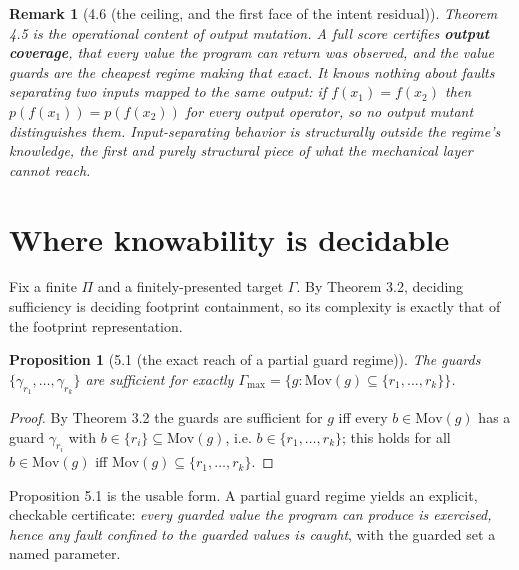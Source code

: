 \documentclass[conference]{IEEEtran}
\newcommand{\Mov}{\mathrm{Mov}}
\theoremstyle{run}
\newtheorem*{proposition}{Proposition}
\newtheorem*{remark}{Remark}
\begin{document}
\begin{remark}[4.6 (the ceiling, and the first face of the intent residual)]
Theorem 4.5 is the operational content of output mutation. A full score certifies \textbf{output coverage}, that every value the program can return was observed, and the value guards are the cheapest regime making that exact. It knows nothing about faults separating two inputs mapped to the same output: if $f(x_1) = f(x_2)$ then $p(f(x_1)) = p(f(x_2))$ for every output operator, so no output mutant distinguishes them. Input-separating behavior is structurally outside the regime's knowledge, the first and purely structural piece of what the mechanical layer cannot reach.
\end{remark}

\setcounter{section}{4}
\section{Where knowability is decidable}
Fix a finite $\Pi$ and a finitely-presented target $\Gamma$. By Theorem 3.2, deciding sufficiency is deciding footprint containment, so its complexity is exactly that of the footprint representation.

\begin{proposition}[5.1 (the exact reach of a partial guard regime)]
The guards $\{\gamma_{r_1},\dots, \gamma_{r_k}\}$ are sufficient for exactly $\Gamma_{\max} = \{ g : \Mov(g) \subseteq \{r_1,\dots,r_k\} \}$.
\end{proposition}

\begin{proof}
By Theorem 3.2 the guards are sufficient for $g$ iff every $b\in\Mov(g)$ has a guard $\gamma_{r_i}$ with $b\in\{r_i\}\subseteq\Mov(g)$, i.e. $b\in\{r_1,\dots,r_k\}$; this holds for all $b\in\Mov(g)$ iff $\Mov(g)\subseteq\{r_1,\dots,r_k\}$.
\end{proof}

Proposition 5.1 is the usable form. A partial guard regime yields an explicit, checkable certificate: \emph{every guarded value the program can produce is exercised, hence any fault confined to the guarded values is caught}, with the guarded set a named parameter.
\end{document}
